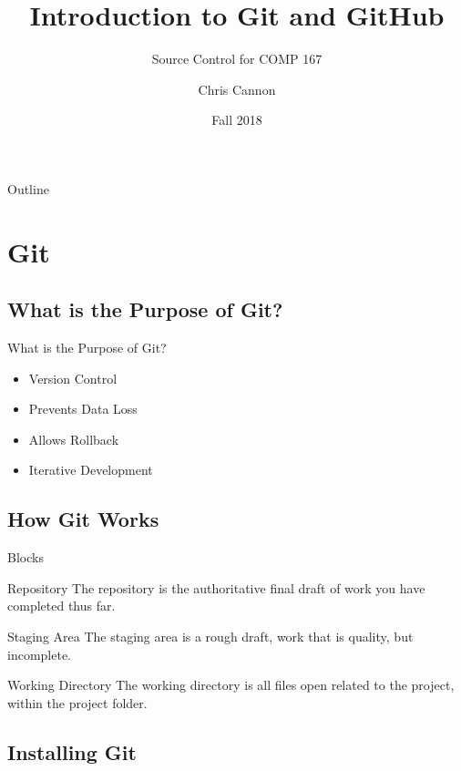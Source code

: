 \documentclass{beamer}
\title{Introduction to Git and GitHub}
\subtitle{Source Control for COMP 167}
\author{Chris Cannon}
\institute[NCAT] %
{
  Department of Computer Science\\
  North Carolina Agricultural and Technical State University
}
\date{Fall 2018}
\begin{document}
\begin{frame}
  \titlepage
\end{frame}

\begin{frame}{Outline}
  \tableofcontents
\end{frame}

\section{Git}

\subsection{What is the Purpose of Git?}

\begin{frame}{What is the Purpose of Git?}
  \begin{itemize}
  \item {
    Version Control
    \pause
  }
  \item {
    Prevents Data Loss
    \pause
  }
  \item {
	Allows Rollback  
	\pause
  }
  \item {
  	Iterative Development
  }
  \end{itemize}
\end{frame}

\subsection{How Git Works}

\begin{frame}{Blocks}
\begin{block}{Repository}
The repository is the authoritative final draft of work you have completed thus far.
\end{block}
\begin{block}{Staging Area}
The staging area is a rough draft, work that is quality, but incomplete.
\end{block}
\begin{block}{Working Directory}
The working directory is all files open related to the project, within the project folder.
\end{block}
\end{frame}

\subsection{Installing Git}
\end{document}
